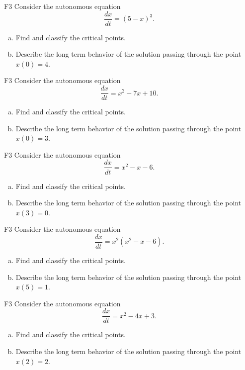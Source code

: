 \begin{problem}{F3}
Consider the autonomous equation
\[
\frac{dx}{dt} = (5 - x)^3.
\]
\begin{enumerate}[(a)]
\item Find and classify the critical points.
\item Describe the long term behavior of the solution passing through the point \(x(0)=4\).
\end{enumerate}
\end{problem}

\begin{problem}{F3}
Consider the autonomous equation
\[
\frac{dx}{dt} = x^2 - 7x + 10.
\]
\begin{enumerate}[(a)]
\item Find and classify the critical points.
\item Describe the long term behavior of the solution passing through the point \(x(0)=3\).
\end{enumerate}
\end{problem}

\begin{problem}{F3}
Consider the autonomous equation
\[
\frac{dx}{dt} = x^2 - x - 6.
\]
\begin{enumerate}[(a)]
\item Find and classify the critical points.
\item Describe the long term behavior of the solution passing through the point \(x(3)=0\).
\end{enumerate}
\end{problem}

\begin{problem}{F3}
Consider the autonomous equation
\[
\frac{dx}{dt} = x^2(x^2 - x - 6).
\]
\begin{enumerate}[(a)]
\item Find and classify the critical points.
\item Describe the long term behavior of the solution passing through the point \(x(5)=1\).
\end{enumerate}
\end{problem}

\begin{problem}{F3}
Consider the autonomous equation
\[
\frac{dx}{dt} = x^2 - 4x + 3.
\]
\begin{enumerate}[(a)]
\item Find and classify the critical points.
\item Describe the long term behavior of the solution passing through the point \(x(2)=2\).
\end{enumerate}
\end{problem}

